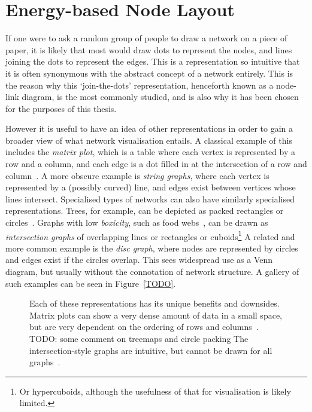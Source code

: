 \chapter{Energy-based Node Layout}
If one were to ask a random group of people to draw a network on a piece of paper, it is likely that most would draw dots to represent the nodes, and lines joining the dots to represent the edges. This is a representation so intuitive that it is often synonymous with the abstract concept of a network entirely.
This is the reason why this `join-the-dots' representation, henceforth known as a node-link diagram, is the most commonly studied, and is also why it has been chosen for the purposes of this thesis.

However it is useful to have an idea of other representations in order to gain a broader view of what network visualisation entails. A classical example of this includes the \emph{matrix plot}, which is a table where each vertex is represented by a row and a column, and each edge is a dot filled in at the intersection of a row and column~\cite{TODO}.
A more obscure example is \emph{string graphs}, where each vertex is represented by a (possibly curved) line, and edges exist between vertices whose lines intersect.
Specialised types of networks can also have similarly specialised representations. Trees, for example, can be depicted as packed rectangles or circles~\cite{TODO}.
Graphs with low \emph{boxicity}, such as food webs~\cite{TODO}, can be drawn as \emph{intersection graphs} of overlapping lines or rectangles or cuboids\footnote{Or hypercuboids, although the usefulness of that for visualisation is likely limited.}
A related and more common example is the \emph{disc graph}, where nodes are represented by circles and edges exist if the circles overlap. This sees widespread use as a Venn diagram, but usually without the connotation of network structure.
A gallery of such examples can be seen in Figure~\ref{TODO}.

\begin{figure}
\caption{Each of these representations has its unique benefits and downsides. Matrix plots can show a very dense amount of data in a small space, but are very dependent on the ordering of rows and columns~\cite{TODO}.
TODO: some comment on treemaps and circle packing
The intersection-style graphs are intuitive, but cannot be drawn for all graphs~\cite{TODO}. }
\label{graphrepresentations}
\end{figure}

